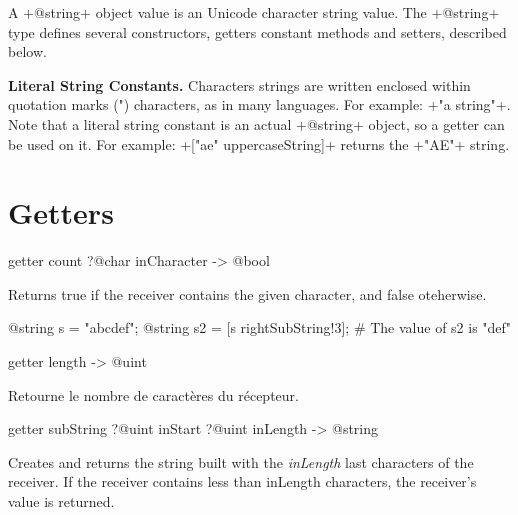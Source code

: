 

A \ggs+@string+ object value is an Unicode character string value. The \ggs+@string+ type defines several constructors, getters constant methods and setters, described below.

\textbf{Literal String Constants.} Characters strings are written enclosed within quotation marks (") characters, as in many languages. For example: \ggs+"a string"+. Note that a literal string constant is an actual \ggs+@string+ object, so a getter can be used on it. For example: \ggs+["ae" uppercaseString]+ returns the \ggs+"AE"+ string.

\section{Getters}








\begin{galgascode}
getter count ?@char inCharacter -> @bool
\end{galgascode}
Returns true if the receiver contains the given character, and false oteherwise.

\begin{galgascode}
@string s = "abcdef";
@string s2 = [s rightSubString!3]; # The value of s2 is "def"
\end{galgascode}







\begin{galgascode}
getter length -> @uint
\end{galgascode}

Retourne le nombre de caractères du récepteur.









\begin{galgascode}
getter subString ?@uint inStart ?@uint inLength -> @string
\end{galgascode}

Creates and returns the string built with the \emph{inLength} last characters of the receiver. If the receiver contains less than inLength characters, the receiver’s value is returned.




